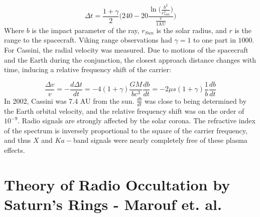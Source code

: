 \documentclass[oneside]{book}
\theoremstyle{mystyle}
\begin{document}
\begin{equation}
\Delta t = \frac{1+\gamma}{2}\bigg(240 - 20\frac{\ln\bigg(\frac{b^2}{r_{sun}^2}\bigg)}{\frac{r}{1\textrm{AU}}}\bigg)
\end{equation}
Where $b$ is the impact parameter of the ray, $r_{Sun}$ is the solar radius, and $r$ is the range to the spacecraft. Viking range observations had $\gamma=1$ to one part in $1000$. For Cassini, the radial velocity was measured. Due to motions of the spacecraft and the Earth during the conjunction, the closest approach distance changes with time, inducing a relative frequency shift of the carrier:

\begin{equation}
\frac{\Delta v}{v} = -\frac{d\Delta t}{dt} = -4(1+\gamma)\frac{GM}{bc^3}\frac{db}{dt} = -2\mu s(1+\gamma)\frac{1}{b}\frac{db}{dt}
\end{equation}
In 2002, Cassini was 7.4 AU from the sun. $\frac{db}{dt}$ was close to being determined by the Earth orbital velocity, and the relative frequency shift was on the order of $10^{-9}$. Radio signals are strongly affected by the solar corona. The refractive index of the spectrum is inversely proportional to the square of the carrier frequency, and thus $X$ and $Ka-$band signals were nearly completely free of these plasma effects. 
%
\section{Theory of Radio Occultation by Saturn's Rings - Marouf et. al.}
%
\end{document}
